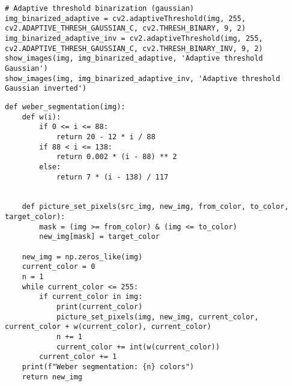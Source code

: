 \begin{lstlisting}[caption={Исходный код для адаптивной бинаризации (по функции Гаусса)}, label={lst:adaptive_gaussian}]
# Adaptive threshold binarization (gaussian)
img_binarized_adaptive = cv2.adaptiveThreshold(img, 255, cv2.ADAPTIVE_THRESH_GAUSSIAN_C, cv2.THRESH_BINARY, 9, 2)
img_binarized_adaptive_inv = cv2.adaptiveThreshold(img, 255, cv2.ADAPTIVE_THRESH_GAUSSIAN_C, cv2.THRESH_BINARY_INV, 9, 2)
show_images(img, img_binarized_adaptive, 'Adaptive threshold Gaussian')
show_images(img, img_binarized_adaptive_inv, 'Adaptive threshold Gaussian inverted')
\end{lstlisting}

\begin{lstlisting}[caption={Исзодный код фцнкции для сегментации на основе приниципа Вебера}, label={lst:weber_segmantation}]
def weber_segmentation(img):
    def w(i):
        if 0 <= i <= 88:
            return 20 - 12 * i / 88
        if 88 < i <= 138:
            return 0.002 * (i - 88) ** 2
        else:
            return 7 * (i - 138) / 117


    def picture_set_pixels(src_img, new_img, from_color, to_color, target_color):
        mask = (img >= from_color) & (img <= to_color)
        new_img[mask] = target_color

    new_img = np.zeros_like(img)
    current_color = 0 
    n = 1
    while current_color <= 255:
        if current_color in img:
            print(current_color)
            picture_set_pixels(img, new_img, current_color, current_color + w(current_color), current_color)
            n += 1 
            current_color += int(w(current_color))
        current_color += 1
    print(f"Weber segmentation: {n} colors")
    return new_img 
\end{lstlisting}

